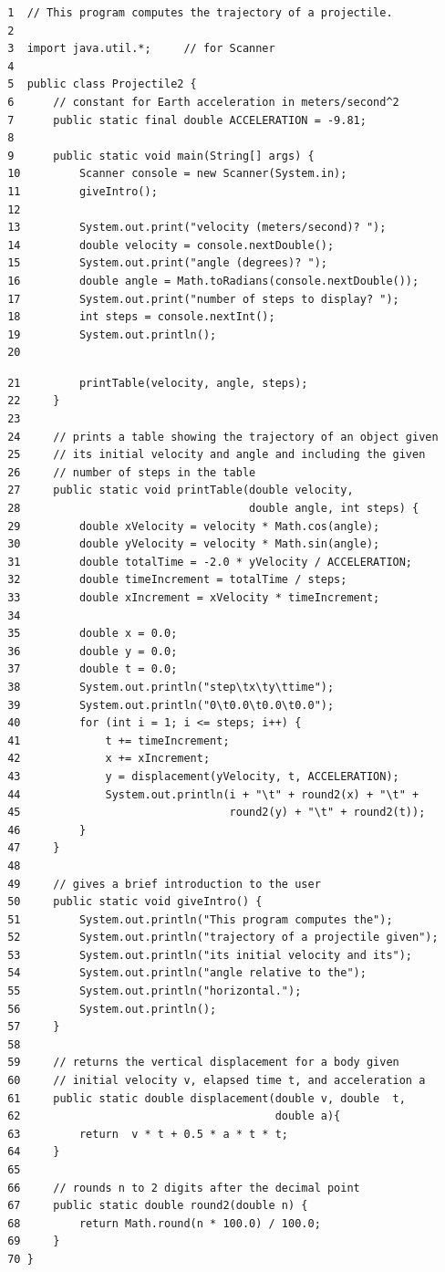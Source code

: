 \begin{verbatim}
 1  // This program computes the trajectory of a projectile.
 2
 3  import java.util.*;     // for Scanner
 4
 5  public class Projectile2 {
 6      // constant for Earth acceleration in meters/second^2
 7      public static final double ACCELERATION = -9.81;
 8
 9      public static void main(String[] args) {
 10         Scanner console = new Scanner(System.in);
 11         giveIntro();
 12
 13         System.out.print("velocity (meters/second)? ");
 14         double velocity = console.nextDouble();
 15         System.out.print("angle (degrees)? ");
 16         double angle = Math.toRadians(console.nextDouble());
 17         System.out.print("number of steps to display? ");
 18         int steps = console.nextInt();
 19         System.out.println();
 20
\end{verbatim}

\begin{verbatim}
 21         printTable(velocity, angle, steps);
 22     }
 23
 24     // prints a table showing the trajectory of an object given
 25     // its initial velocity and angle and including the given
 26     // number of steps in the table
 27     public static void printTable(double velocity,
 28                                   double angle, int steps) {
 29         double xVelocity = velocity * Math.cos(angle);
 30         double yVelocity = velocity * Math.sin(angle);
 31         double totalTime = -2.0 * yVelocity / ACCELERATION;
 32         double timeIncrement = totalTime / steps;
 33         double xIncrement = xVelocity * timeIncrement;
 34
 35         double x = 0.0;
 36         double y = 0.0;
 37         double t = 0.0;
 38         System.out.println("step\tx\ty\ttime");
 39         System.out.println("0\t0.0\t0.0\t0.0");
 40         for (int i = 1; i <= steps; i++) {
 41             t += timeIncrement;
 42             x += xIncrement;
 43             y = displacement(yVelocity, t, ACCELERATION);
 44             System.out.println(i + "\t" + round2(x) + "\t" +
 45                                round2(y) + "\t" + round2(t));
 46         }
 47     }
 48
 49     // gives a brief introduction to the user
 50     public static void giveIntro() {
 51         System.out.println("This program computes the");
 52         System.out.println("trajectory of a projectile given");
 53         System.out.println("its initial velocity and its");
 54         System.out.println("angle relative to the");
 55         System.out.println("horizontal.");
 56         System.out.println();
 57     }
 58
 59     // returns the vertical displacement for a body given
 60     // initial velocity v, elapsed time t, and acceleration a
 61     public static double displacement(double v, double  t,
 62                                       double a){
 63         return  v * t + 0.5 * a * t * t;
 64     }
 65
 66     // rounds n to 2 digits after the decimal point
 67     public static double round2(double n) {
 68         return Math.round(n * 100.0) / 100.0;
 69     }
 70 }
\end{verbatim}

